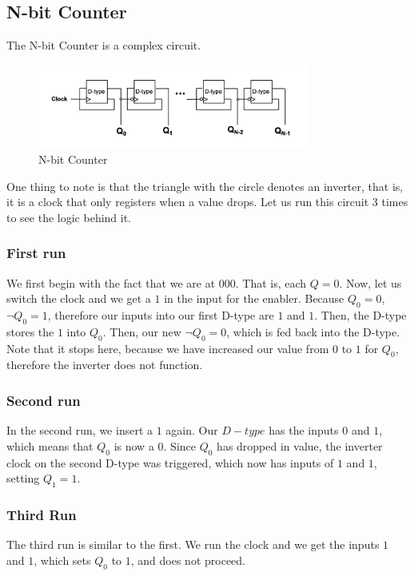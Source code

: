 \documentclass[a4paper]{article}
\theoremstyle{plain}
\theoremstyle{definition}
\theoremstyle{remark}
\begin{document}
\subsection{N-bit Counter}
The N-bit Counter is a complex circuit.
\begin{figure}[H]
	\centering
	\includegraphics[width=0.8\textwidth]{figures/counter.png}
	\caption{N-bit Counter}
	\label{fig:figures-counter-png}
\end{figure}
One thing to note is that the triangle with the circle denotes an inverter, that is, it is a clock that only registers when a value drops. Let us run this circuit 3 times to see the logic behind it.
\subsubsection{First run}
We first begin with the fact that we are at $000$. That is, each $Q=0$. Now, let us switch the clock and we get a $1$ in the input for the enabler. Because $Q_0=0$, $\neg Q_0=1$, therefore our inputs into our first D-type are $1$ and $1$. Then, the D-type stores the $1$ into $Q_0$. Then, our new $\neg Q_0=0$, which is fed back into the D-type. Note that it stops here, because we have increased our value from $0$ to $1$ for $Q_0$, therefore the inverter does not function.
\subsubsection{Second run}
In the second run, we insert a $1$ again. Our $D-type$ has the inputs $0$ and $1$, which means that $Q_0$ is now a $0 $. Since $Q_0$ has dropped in value, the inverter clock on the second D-type was triggered, which now has inputs of $1$ and $1$, setting $Q_1=1$.
\subsubsection{Third Run}
The third run is similar to the first. We run the clock and we get the inputs $1$ and $1$, which sets $Q_0$ to $1$, and does not proceed.
\end{document}
